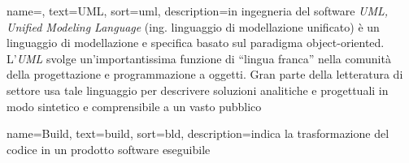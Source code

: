 







 {
    name=,
    text=UML,
    sort=uml,
    description={in ingegneria del software \emph{UML, Unified Modeling Language} (ing. linguaggio di modellazione unificato) è un linguaggio di modellazione e specifica basato sul paradigma object-oriented. L'\emph{UML} svolge un'importantissima funzione di ``lingua franca'' nella comunità della progettazione e programmazione a oggetti. Gran parte della letteratura di settore usa tale linguaggio per descrivere soluzioni analitiche e progettuali in modo sintetico e comprensibile a un vasto pubblico}
}


 {
    name=Build,
    text=build,
    sort=bld,
    description={indica la trasformazione del codice in un prodotto software eseguibile}
}

